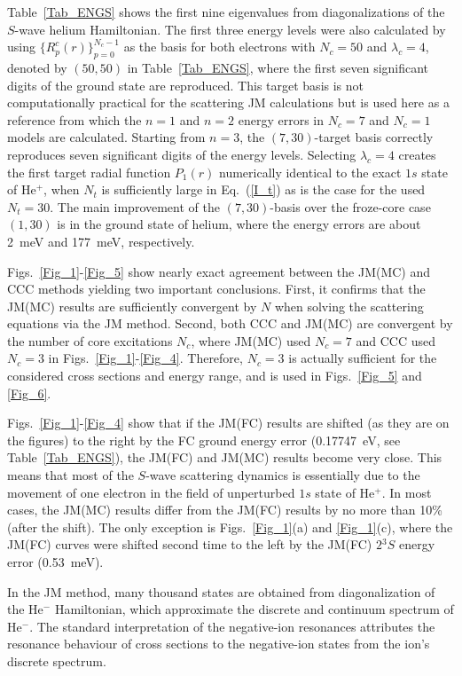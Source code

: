 \documentclass[aip
, pra
, showpacs
, aps
, twocolumn
, groupedaddress
, floatfix
]{revtex4}
\begin{document}
Table~\ref{Tab_ENGS} shows the first nine eigenvalues from diagonalizations of the $S$-wave helium Hamiltonian.
The first three energy levels were also calculated by using
$\{R^{c}_p(r)\}_{p=0}^{N_c-1}$ as the basis for both electrons with $N_c=50$ and $\lambda_c=4$, denoted by $(50,50)$ in Table~\ref{Tab_ENGS},
where the first seven significant digits of the ground state \cite{G94} are reproduced.
This target basis is not computationally practical for the scattering JM calculations but is used here
as a reference from which the $n=1$ and $n=2$ energy errors in $N_c=7$ and $N_c=1$ models are calculated.
Starting from $n=3$, the $(7,30)$-target basis correctly reproduces seven significant digits \cite{DHIF94} of the energy levels.
Selecting $\lambda_c=4$ creates the first target radial function $P_1(r)$ numerically identical to the exact $1s$ state of He$^+$,
when $N_t$ is sufficiently large in Eq.~(\ref{I_t}) as is the case for the used $N_t=30$.
The main improvement of the $(7,30)$-basis over the froze-core case $(1,30)$ is in the ground state of helium,
where the energy errors are about 2~meV and 177~meV, respectively.



Figs.~\ref{Fig_1}-\ref{Fig_5} show nearly exact agreement between the JM(MC) and CCC methods yielding two important conclusions.
First, it confirms that the JM(MC) results are sufficiently convergent by $N$ when solving the scattering equations via the JM method.
Second, both CCC and JM(MC) are convergent by the number of core excitations $N_c$,
where JM(MC) used $N_c=7$ and CCC used $N_c=3$ in Figs.~\ref{Fig_1}-\ref{Fig_4}.
Therefore, $N_c=3$ is actually sufficient for the considered cross sections and energy range, and is used in Figs.~\ref{Fig_5} and \ref{Fig_6}.


Figs.~\ref{Fig_1}-\ref{Fig_4} show that if the JM(FC) results are shifted (as they are on the figures)
to the right by the FC ground energy error (0.17747~eV, see Table~\ref{Tab_ENGS}),
the JM(FC) and JM(MC) results become very close.
This means that most of the $S$-wave scattering dynamics  is essentially due to
the movement of one electron in the field of unperturbed $1s$ state of He$^+$.
In most cases, the JM(MC) results differ from the JM(FC) results by no more than 10\% (after the shift).
The only exception is Figs.~\ref{Fig_1}(a) and \ref{Fig_1}(c), where the JM(FC) curves were shifted second time to the left by
the JM(FC) $2{^3S}$ energy error (0.53~meV).


In the JM method, many thousand states are obtained from diagonalization of the He$^-$ Hamiltonian,
which approximate the discrete and continuum spectrum of He$^-$.
The standard interpretation of the negative-ion resonances \cite{BC94} attributes the resonance behaviour of cross sections to
the negative-ion states from the ion's discrete spectrum.
\end{document}
